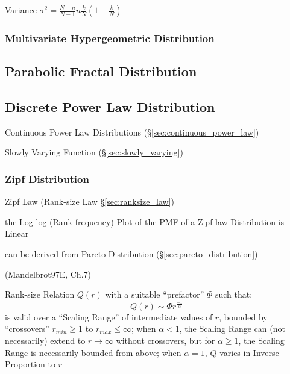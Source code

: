 Variance $\sigma^2 = \frac{N-n}{N-1} n \frac{k}{N}(1 - \frac{k}{N})$



\subsubsection{Multivariate Hypergeometric Distribution}
\label{sec:multivariate_hypergeometric}



\subsection{Parabolic Fractal Distribution}
\label{sec:parabolic_fractal_distribution}

\subsection{Discrete Power Law Distribution}\label{sec:discrete_power_law}

\fist Continuous Power Law Distributions (\S\ref{sec:continuous_power_law})

Slowly Varying Function (\S\ref{sec:slowly_varying})



\subsubsection{Zipf Distribution}\label{sec:zipf_distribution}

Zipf Law (Rank-size Law \S\ref{sec:ranksize_law})

the Log-log (Rank-frequency) Plot of the PMF of a Zipf-law Distribution is
Linear

can be derived from Pareto Distribution (\S\ref{sec:pareto_distribution})

(Mandelbrot97E, Ch.7)

Rank-size Relation $Q(r)$ with a suitable ``prefactor'' $\Phi$ such that:
\[
  Q(r) \sim \Phi r^\frac{-1}{\alpha}
\]
is valid over a ``Scaling Range'' of intermediate values of $r$, bounded by
``crossovers'' $r_{min} \geq 1$ to $r_{max} \leq \infty$; when $\alpha < 1$, the
Scaling Range can (not necessarily) extend to $r \to \infty$ without crossovers,
but for $\alpha \geq 1$, the Scaling Range is necessarily bounded from above;
when $\alpha = 1$, $Q$ varies in Inverse Proportion to $r$



